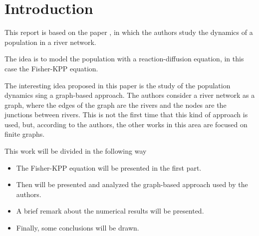 \section{Introduction}
This report is based on the paper \cite{du2019fisherkpp}, in which the authors study the dynamics of a population in a river network.

The idea is to model the population with a reaction-diffusion equation, in this case the Fisher-KPP equation. 

The interesting idea proposed in this paper is the study of the population dynamics sing a graph-based approach. The authors consider a river network as a graph, where the edges of the graph are the rivers and the nodes are the junctions between rivers. This is not the first time that this kind of approach is used, but, according to the authors, the other works in this area are focused on finite graphs.

This work will be divided in the following way
\begin{itemize}
    \item The Fisher-KPP equation will be presented in the first part.
    \item Then will be presented and analyzed the graph-based approach used by the authors.
    \item A brief remark about the numerical results will be presented.
    \item Finally, some conclusions will be drawn.
\end{itemize}

